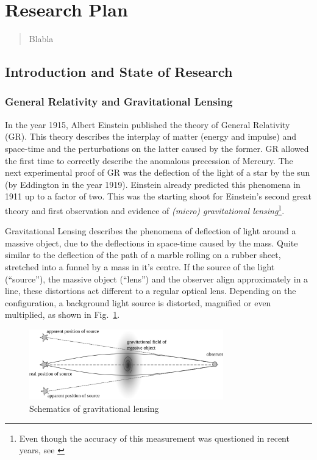 \documentclass[11pt]{article}
\begin{document}
\newpage

\section*{Research Plan}

\begin{abstract}
Blabla
\end{abstract}


\subsection{Introduction and State of Research}
\label{sec:intro}

\subsubsection{General Relativity and Gravitational Lensing}

In the year 1915, Albert Einstein published the theory of General Relativity (GR).
This theory describes the interplay of matter (energy and impulse) and space-time and the perturbations on the latter caused by the former.
GR allowed the first time to correctly describe the anomalous precession of Mercury.
The next experimental proof of GR was the deflection of the light of a star by the sun (by Eddington in the year 1919).
Einstein already predicted this phenomena in 1911 up to a factor of two.
This was the starting shoot for Einstein’s second great theory and first observation and evidence of \emph{(micro) gravitational lensing}\footnote{Even though the accuracy of this measurement was questioned in recent years, see \cite{kennefick2009testing}}.

Gravitational Lensing describes the phenomena of deflection of light around a massive object, due to the deflections in space-time caused by the mass.
Quite similar to the deflection of the path of a marble rolling on a rubber sheet, stretched into a funnel by a mass in it's centre.
If the source of the light (``source''), the massive object (``lens'') and the observer align approximately in a line, these distortions act different to a regular optical lens.
Depending on the configuration, a background light source is distorted, magnified or even multiplied, as shown in Fig.~\ref{fig:grav_lens}.

\begin{figure}[h]
	\centering
		\includegraphics[width=0.75\textwidth]{img/grav_lens}
	\caption{Schematics of gravitational lensing}
	\label{fig:grav_lens}
\end{figure}
\end{document}
